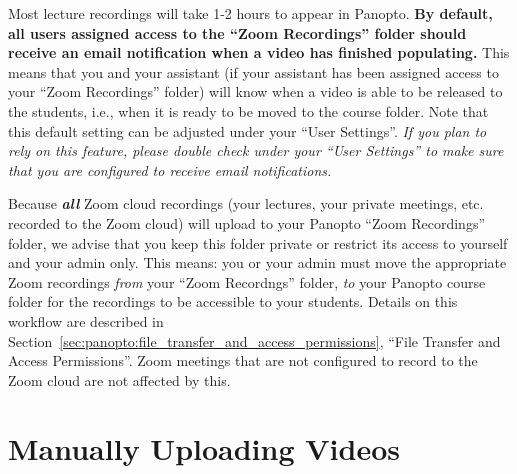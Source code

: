 \begin{gram}
	Most lecture recordings will take 1-2 hours to appear in Panopto. \textbf{By default, all users assigned access to the ``Zoom Recordings'' folder should receive an email notification when a video has finished populating.} This means that you and your assistant (if your assistant has been assigned access to your ``Zoom Recordings'' folder) will know when a video is able to be released to the students, i.e., when it is ready to be moved to the course folder. Note that this default setting can be adjusted under your ``User Settings''. \textit{If you plan to rely on this feature, please double check under your ``User Settings'' to make sure that you are configured to receive email notifications.}
\end{gram}

\begin{important}
	Because \emph{\textbf{all}} Zoom cloud recordings (your lectures, your private meetings, etc. recorded to the Zoom cloud) will upload to your Panopto ``Zoom Recordings'' folder, we advise that you keep this folder private or restrict its access to yourself and your admin only. This means: you or your admin must move the appropriate Zoom recordings \emph{from} your ``Zoom Recordngs'' folder, \emph{to} your Panopto course folder for the recordings to be accessible to your students. Details on this workflow are described in Section~\ref{sec:panopto:file_transfer_and_access_permissions}, ``File Transfer and Access Permissions''. Zoom meetings that are not configured to record to the Zoom cloud are not affected by this.
\end{important}


\section{Manually Uploading Videos}
\label{sec:panopto:manually_uploading_videos}


